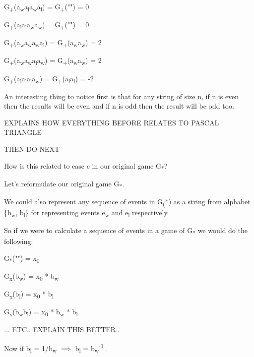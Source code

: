\documentclass[12pt,reqno]{amsart}
\begin{document}
G\textsubscript{+}(a\textsubscript{w}a\textsubscript{l}a\textsubscript{w}a\textsubscript{l}) = G\textsubscript{+}("") = 0

G\textsubscript{+}(a\textsubscript{l}a\textsubscript{l}a\textsubscript{w}a\textsubscript{w}) = G\textsubscript{+}("") = 0

G\textsubscript{+}(a\textsubscript{w}a\textsubscript{w}a\textsubscript{w}a\textsubscript{l}) = G\textsubscript{+}(a\textsubscript{w}a\textsubscript{w}) =  2

G\textsubscript{+}(a\textsubscript{w}a\textsubscript{w}a\textsubscript{l}a\textsubscript{w}) = G\textsubscript{+}(a\textsubscript{w}a\textsubscript{w}) = 2

G\textsubscript{+}(a\textsubscript{l}a\textsubscript{l}a\textsubscript{l}a\textsubscript{w}) = G\textsubscript{+}(a\textsubscript{l}a\textsubscript{l}) = -2

An interesting thing to notice first is that for any string of size n, if n is even then the results will be even and if n is odd then the result will be odd too.

EXPLAINS HOW EVERYTHING BEFORE RELATES TO PASCAL TRIANGLE

THEN DO NEXT


How is this related to case c in our original game G\textsubscript{*}?


Let's reformulate our original game G\textsubscript{*}.

We could also represent any sequence of events in G\textsubscript(*) as a string from alphabet \{b\textsubscript{w}, b\textsubscript{l}\} for representing events e\textsubscript{w} and e\textsubscript{l} respectively.

So if we were to calculate a sequence of events in a game of G\textsubscript{*} we would do the following:

G\textsubscript{*}("") = x\textsubscript{0}

G\textsubscript{x}(b\textsubscript{w}) = x\textsubscript{0} * b\textsubscript{w}

G\textsubscript{x}(b\textsubscript{l}) = x\textsubscript{0} * b\textsubscript{l}

G\textsubscript{x}(b\textsubscript{w}b\textsubscript{l}) = x\textsubscript{0} * b\textsubscript{w} * b\textsubscript{l}

... ETC.. EXPLAIN THIS BETTER..

Now if b\textsubscript{l} = 1/b\textsubscript{w} $\implies$ b\textsubscript{l} = b\textsubscript{w}\textsuperscript{-1} .
\end{document}
